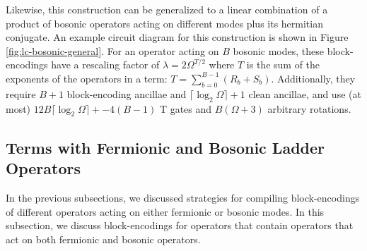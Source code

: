 \begin{figure*}
    
    \caption{
        \textbf{Generalized Block-Encoding Product of Bosonic Ladder Operators Plus Hermitian Conjugate}
        A block-encoding for the operator $((a_i^\dagger)^{R_i} + a_i^{S_i})((a_j^\dagger)^{R_j} + a_j^{S_j})...((a_m^\dagger)^{R_m} + a_m^{S_m}) + h.c.$ is given.
    }
    \label{fig:lc-bosonic-general}
\end{figure*}

Likewise, this construction can be generalized to a linear combination of a product of bosonic operators acting on different modes plus its hermitian conjugate.
An example circuit diagram for this construction is shown in Figure \ref{fig:lc-bosonic-general}.
For an operator acting on $B$ bosonic modes, these block-encodings have a rescaling factor of $\lambda = 2 \Omega^{T/2}$ where $T$ is the sum of the exponents of the operators in a term: $T = \sum_{b=0}^{B-1}(R_b+S_b)$.
Additionally, they require $B+1$ block-encoding ancillae and $\lceil{\log_2{\Omega}}\rceil + 1$ clean ancillae, and use (at most) $12B \lceil \log_2 \Omega \rceil + - 4(B - 1)$ T gates and $B(\Omega + 3)$ arbitrary rotations.


\subsection{Terms with Fermionic and Bosonic Ladder Operators}

In the previous subsections, we discussed strategies for compiling block-encodings of different operators acting on either fermionic or bosonic modes.
In this subsection, we discuss block-encodings for operators that contain operators that act on both fermionic and bosonic operators.

\begin{figure*}
    
    
    
    \caption{
        \textbf{Block-Encoding Terms}
        In (a), a block-encoding for the operator $b_i^\dagger a_j^\dagger + a_j b_i$ is given.
        In (b), a block-encoding for the operator $ b_i^\dagger b_j^\dagger a_k^\dagger + a_k b_j b_i$ is given.
        In (c), a block-encoding for the operator $b_i^\dagger b_j^\dagger a_k^\dagger a_l^\dagger + a_l a_k b_j b_i$ is given.
    }
    \label{fig:be-term-example}
\end{figure*}


